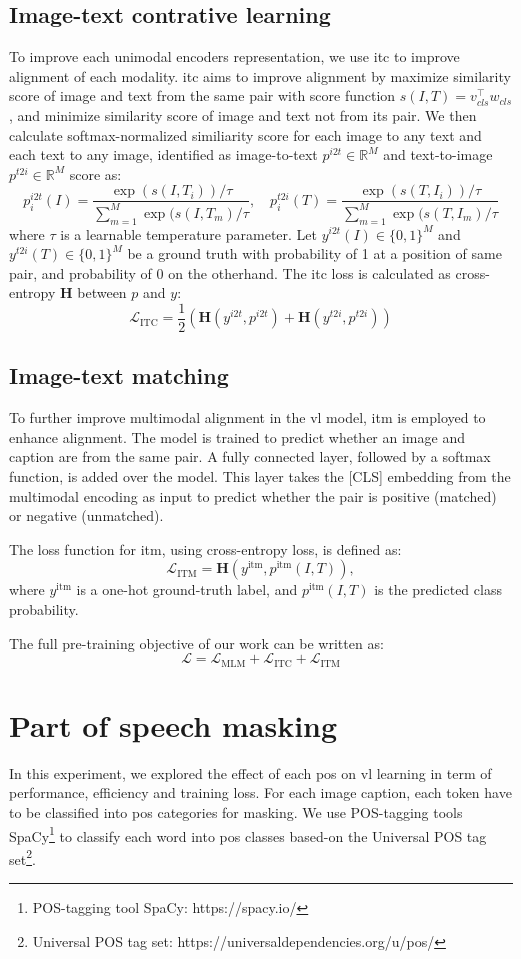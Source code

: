 \subsection{Image-text contrative learning}
To improve each unimodal encoders representation, we use \acrlong{itc} to improve alignment of each modality.
\acrshort{itc} aims to improve alignment by maximize similarity score of image and text from the same pair with score function \(s(I, T) = v_{cls}^\top w_{cls}\), and minimize similarity score of image and text not from its pair.
We then calculate softmax-normalized similiarity score for each image to any text and each text to any image, identified as image-to-text \(p^{i2t} \in \mathbb{R}^{M}\) and text-to-image \(p^{t2i} \in \mathbb{R}^{M}\) score as:
\[
    p^{i2t}_i(I) = \frac{ \exp{(s(I,T_i))/\tau} }{ \sum_{m=1}^{M}\exp{(s(I,T_m)/\tau} }, \quad p^{t2i}_i(T) = \frac{ \exp{(s(T,I_i))/\tau} }{ \sum_{m=1}^{M}\exp{(s(T,I_m)/\tau} }
\]
where \(\tau\) is a learnable temperature parameter. Let \( y^{i2t}(I) \in \{0,1\}^M \) and \( y^{t2i}(T) \in \{0,1\}^M \) be a ground truth with probability of 1 at a position of same pair, and probability of 0 on the otherhand.
The \acrshort{itc} loss is calculated as cross-entropy \(\mathbf{H}\) between \(p\) and \(y\):
\[
    \mathcal{L}_{\text{ITC}} = \frac{1}{2}(\mathbf{H}(y^{i2t},p^{i2t}) + \mathbf{H}(y^{t2i},p^{t2i}))
\]
\subsection{Image-text matching}
To further improve multimodal alignment in the \acrshort{vl} model, \acrlong{itm} is employed to enhance alignment. 
The model is trained to predict whether an image and caption are from the same pair. 
A fully connected layer, followed by a softmax function, is added over the model. 
This layer takes the [CLS] embedding from the multimodal encoding as input to predict whether the pair is positive (matched) or negative (unmatched). 

The loss function for \acrshort{itm}, using cross-entropy loss, is defined as:
\[
    \mathcal{L}_{\text{ITM}} = \mathbf{H}(y^{\text{itm}}, p^{\text{itm}}(I, T)),
\]
where \(y^{\text{itm}}\) is a one-hot ground-truth label, and \(p^{\text{itm}}(I, T)\) is the predicted class probability.

The full pre-training objective of our work can be written as:
\[
    \mathcal{L} = \mathcal{L}_{\text{MLM}} + \mathcal{L}_{\text{ITC}} + \mathcal{L}_{\text{ITM}}
\]

\section{Part of speech masking}
In this experiment, we explored the effect of each \acrshort{pos} on \acrshort{vl} learning in term of performance, efficiency and training loss.
For each image caption, each token have to be classified into \acrshort{pos} categories for masking.
We use POS-tagging tools SpaCy\footnote{POS-tagging tool SpaCy: https://spacy.io/} to classify each word into \acrshort{pos} classes based-on the Universal POS tag set\footnote{Universal POS tag set: https://universaldependencies.org/u/pos/}.

